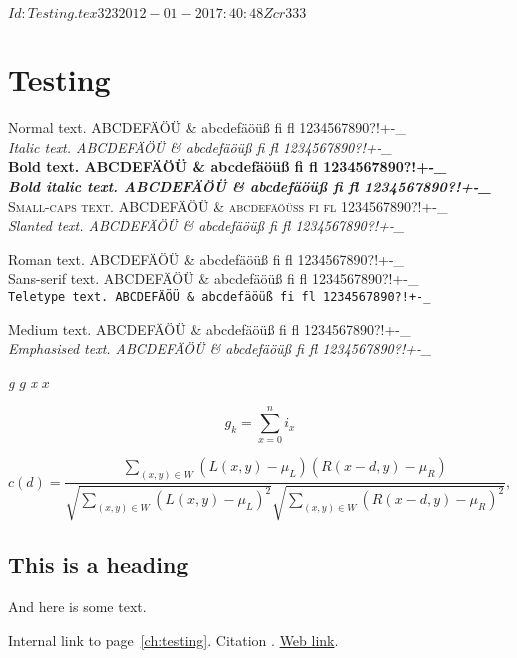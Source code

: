 
\svnInfo $Id: Testing.tex 323 2012-01-20 17:40:48Z cr333 $

\chapter*{Testing}
\label{ch:testing}

\newcommand{\fonttest}{ABCDEFÄÖÜ \& abcdefäöüß fi fl 1234567890?!+-_}

Normal text. \fonttest\\
\textit{Italic text. \fonttest}\\
\textbf{Bold text. \fonttest}\\
\textbf{\textit{Bold italic text. \fonttest}}\\
\textsc{Small-caps text. \fonttest}\\
\textsl{Slanted text. \fonttest}

\textrm{Roman text. \fonttest}\\
\textsf{Sans-serif text. \fonttest}\\
\texttt{Teletype text. \fonttest}

\textmd{Medium text. \fonttest}\\
\emph{Emphasised text. \fonttest}


\textit{g} $g$ \textit{x} $x$

\begin{equation}
g_k = \sum_{x=0}^n {i_x}
\end{equation}

\begin{equation}\displaystyle
c(d) = \frac{\displaystyle
  \sum_{\left(x,y\right) \in W}{\left(L(x,y) - \mu_L\right) \left(R(x-d,y) - \mu_R\right)}
}{
  \sqrt{\displaystyle\sum_{\left(x,y\right) \in W}{\left(L(x,y) - \mu_L\right)^2}}
  \sqrt{\displaystyle\sum_{\left(x,y\right) \in W}{\left(R(x-d,y) - \mu_R\right)^2}}
},
\end{equation}

\section{This is a heading}

And here is some text.


Internal link to page~\ref{ch:testing}.
Citation \citep{Richa2008}.
\href{http://www.cl.cam.ac.uk/~cr333/}{Web link}.